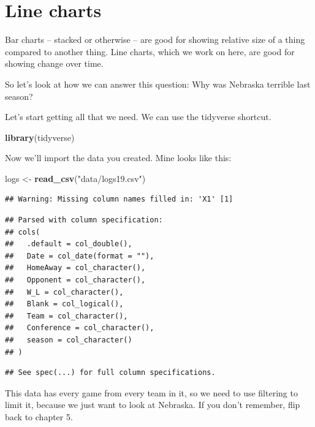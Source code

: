 \documentclass[]{book}
\newenvironment{Shaded}{\begin{snugshade}}{\end{snugshade}}
\newcommand{\KeywordTok}[1]{\textcolor[rgb]{0.13,0.29,0.53}{\textbf{#1}}}
\newcommand{\StringTok}[1]{\textcolor[rgb]{0.31,0.60,0.02}{#1}}
\newcommand{\NormalTok}[1]{#1}
\begin{document}
\chapter{Line charts}\label{line-charts}

Bar charts -- stacked or otherwise -- are good for showing relative size
of a thing compared to another thing. Line charts, which we work on
here, are good for showing change over time.

So let's look at how we can answer this question: Why was Nebraska
terrible last season?

Let's start getting all that we need. We can use the tidyverse shortcut.

\begin{Shaded}
\begin{Highlighting}[]
\KeywordTok{library}\NormalTok{(tidyverse)}
\end{Highlighting}
\end{Shaded}

Now we'll import the data you created. Mine looks like this:

\begin{Shaded}
\begin{Highlighting}[]
\NormalTok{logs <-}\StringTok{ }\KeywordTok{read_csv}\NormalTok{(}\StringTok{"data/logs19.csv"}\NormalTok{)}
\end{Highlighting}
\end{Shaded}

\begin{verbatim}
## Warning: Missing column names filled in: 'X1' [1]
\end{verbatim}

\begin{verbatim}
## Parsed with column specification:
## cols(
##   .default = col_double(),
##   Date = col_date(format = ""),
##   HomeAway = col_character(),
##   Opponent = col_character(),
##   W_L = col_character(),
##   Blank = col_logical(),
##   Team = col_character(),
##   Conference = col_character(),
##   season = col_character()
## )
\end{verbatim}

\begin{verbatim}
## See spec(...) for full column specifications.
\end{verbatim}

This data has every game from every team in it, so we need to use
filtering to limit it, because we just want to look at Nebraska. If you
don't remember, flip back to chapter 5.
\end{document}
